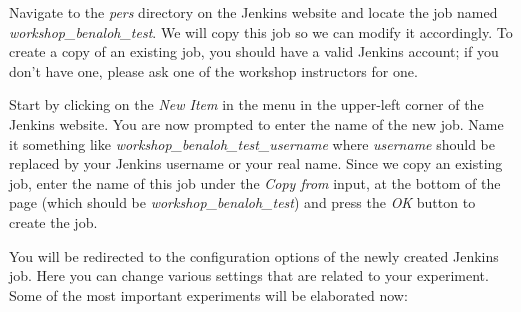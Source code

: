 \documentclass{article}
\begin{document}
Navigate to the \emph{pers} directory on the Jenkins website and locate the job named \emph{workshop\_benaloh\_test}.
We will copy this job so we can modify it accordingly.
To create a copy of an existing job, you should have a valid Jenkins account; if you don't have one, please ask one of the workshop instructors for one.

Start by clicking on the \emph{New Item} in the menu in the upper-left corner of the Jenkins website.
You are now prompted to enter the name of the new job.
Name it something like \emph{workshop\_benaloh\_test\_username} where \emph{username} should be replaced by your Jenkins username or your real name.
Since we copy an existing job, enter the name of this job under the \emph{Copy from} input, at the bottom of the page (which should be \emph{workshop\_benaloh\_test}) and press the \emph{OK} button to create the job.

You will be redirected to the configuration options of the newly created Jenkins job.
Here you can change various settings that are related to your experiment.
Some of the most important experiments will be elaborated now:
\end{document}

